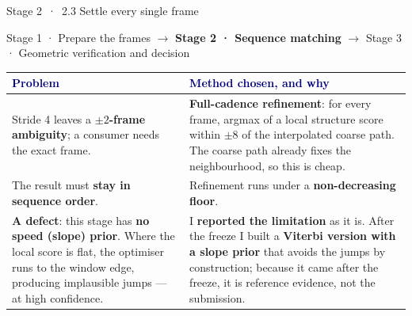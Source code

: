 \documentclass[10pt,aspectratio=169]{beamer}
\begin{document}
\begin{frame}{Stage 2 \,·\, 2.3 Settle every single frame}
\vspace{-5pt}
\begin{center}\end{center}
\vspace{-9pt}\begin{center}\tiny \textcolor{navy!55}{Stage 1 · Prepare the frames} $\rightarrow$ \textbf{Stage 2 · Sequence matching} $\rightarrow$ \textcolor{navy!55}{Stage 3 · Geometric verification and decision}\end{center}
\vspace{-3pt}
\footnotesize\setlength{\tabcolsep}{5pt}\renewcommand{\arraystretch}{1.05}
\begin{tabularx}{\textwidth}{@{}>{\raggedright\arraybackslash}p{}>{\raggedright\arraybackslash}X@{}}
\toprule \textcolor{navy}{\textbf{Problem}} & \textcolor{navy}{\textbf{Method chosen, and why}} \\ \midrule
Stride 4 leaves a \textbf{$\pm2$-frame ambiguity}; a consumer needs the exact frame. & \textbf{Full-cadence refinement}: for every frame, argmax of a local structure score within $\pm8$ of the interpolated coarse path. The coarse path already fixes the neighbourhood, so this is cheap. \\
\addlinespace[3pt]
The result must \textbf{stay in sequence order}. & Refinement runs under a \textbf{non-decreasing floor}. \\
\addlinespace[3pt]
\textbf{A defect}: this stage has \textbf{no speed (slope) prior}. Where the local score is flat, the optimiser runs to the window edge, producing implausible jumps --- at high confidence. & I \textbf{reported the limitation} as it is. After the freeze I built a \textbf{Viterbi version with a slope prior} that avoids the jumps by construction; because it came after the freeze, it is reference evidence, not the submission. \\
\bottomrule\end{tabularx}
\end{frame}
\end{document}
